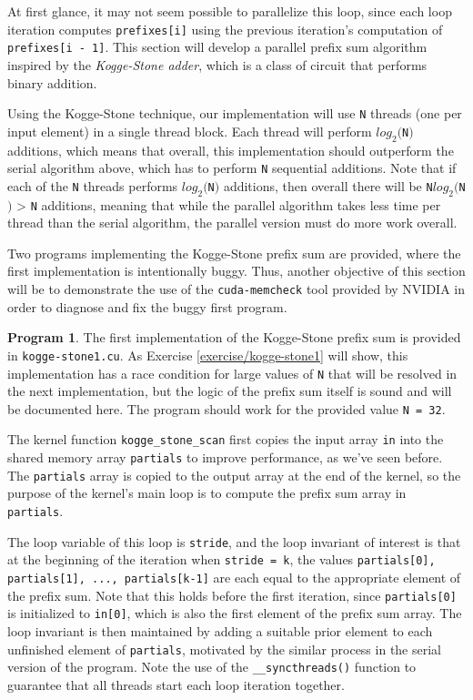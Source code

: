 \documentclass{article}
\theoremstyle{definition}
\newtheorem{program}{Program}
\begin{document}
At first glance, it may not seem possible to parallelize this loop, since each loop iteration computes \texttt{prefixes[i]} using the previous iteration's computation of \texttt{prefixes[i - 1]}. This section  will develop a parallel prefix sum algorithm inspired by the \emph{Kogge-Stone adder}, which is a class of circuit that performs binary addition. 

Using the Kogge-Stone technique, our implementation will use \texttt{N} threads (one per input element) in a single thread block. Each thread will perform $log_2($\texttt{N}$)$ additions, which means that overall, this implementation  should outperform the serial algorithm above, which has to perform \texttt{N} sequential additions. Note that if each of the \texttt{N} threads performs $log_2($\texttt{N}$)$ additions, then overall there will be \texttt{N}$log_2($\texttt{N}$)$ > \texttt{N} additions, meaning that while the parallel algorithm takes less time per thread than the serial algorithm, the parallel version must do more work overall.

Two programs implementing the Kogge-Stone prefix sum are provided, where the first implementation is intentionally buggy. Thus, another objective of this section will be to demonstrate the use of the \texttt{cuda-memcheck} tool provided by NVIDIA in order to diagnose and fix the buggy first program.

\begin{program}
The first implementation of the Kogge-Stone prefix sum is provided in \texttt{kogge-stone1.cu}. As Exercise \ref{exercise/kogge-stone1} will show, this implementation has a race condition for large values of \texttt{N} that will be resolved in the next implementation, but the logic of the prefix sum itself is sound and will be documented here. The program should work for the provided value \texttt{N = 32}.

The kernel function \texttt{kogge\_stone\_scan} first copies the input array \texttt{in} into the shared memory array \texttt{partials} to improve performance, as we've seen before. The \texttt{partials} array is copied to the output array at the end of the kernel, so the purpose of the kernel's main loop is to compute the prefix sum array in \texttt{partials}.

The loop variable of this loop is \texttt{stride}, and the loop invariant of interest is that at the beginning of the iteration when \texttt{stride = k}, the values \texttt{partials[0], partials[1], ..., partials[k-1]} are each equal to the appropriate element of the prefix sum. Note that this holds before the first iteration, since \texttt{partials[0]} is initialized to \texttt{in[0]}, which is also the first element of the prefix sum array. The loop invariant is then maintained by adding a suitable prior element to each unfinished element of \texttt{partials}, motivated by the similar process in the serial version of the program. Note the use of the \texttt{\_\_syncthreads()} function to guarantee that all threads start each loop iteration together.
\end{program}
\end{document}
